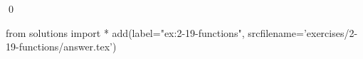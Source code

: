 
\begin{ex}
  \label{ex:2-19-functions}
  
  \qed
\end{ex}
\begin{python0}
from solutions import *
add(label="ex:2-19-functions",
    srcfilename='exercises/2-19-functions/answer.tex')
\end{python0}
